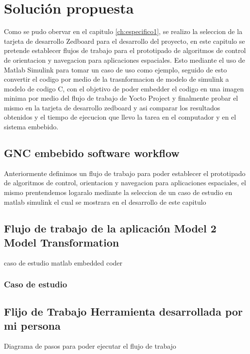 \chapter{Solución propuesta}
\label{ch:especifico2}

Como se pudo obervar en el capitulo \ref{ch:especifico1}, se realizo la seleccion de la tarjeta de desarrollo Zedboard para el desarrollo del proyecto, en este capitulo se pretende establecer flujos de trabajo para el prototipado de algoritmos de control de orientacion y navegacion para aplicaciones espaciales. Esto mediante el uso de Matlab Simulink para tomar un caso de uso como ejemplo, seguido de esto convertir el codigo por medio de la trasnformacion de modelo de simulink a modelo de codigo C, con el objetivo de poder embedder el codigo en una imagen minima por medio del flujo de trabajo de Yocto Project y finalmente probar el mismo en la tarjeta de desarrollo zedboard y asi comparar los resultados obtenidos y el tiempo de ejecucion que llevo la tarea en el computador y en el sistema embebido.

\section{GNC embebido software workflow}

Anteriormente definimos un flujo de trabajo para poder establecer el prototipado de algoritmos de control, orientacion y navegacion para aplicaciones espaciales, el mismo prentendemos logaralo mediante la seleccion de un caso de estudio en matlab simulink el cual se mostrara en el desarrollo de este capitulo

\section{Flujo de trabajo de la aplicación Model 2 Model Transformation}
caso de estudio matlab embedded coder



\subsection{Caso de estudio}


\section{Flijo de Trabajo Herramienta desarrollada por mi persona}
Diagrama de pasos para poder ejecutar el flujo de trabajo

